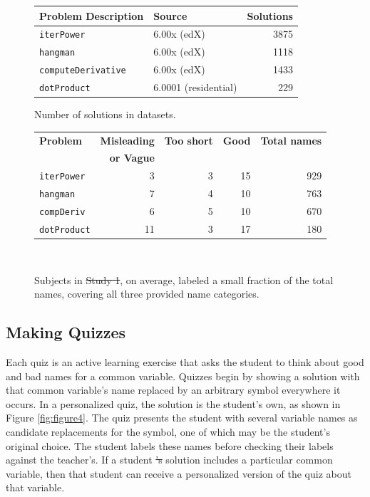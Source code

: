 \documentclass[12pt,twoside]{mitthesis}
\newcommand\tabhead[1]{\small\textbf{#1}}
\newcommand \codevar[1]{\texttt{#1}}
\providecommand{\DIFaddtex}[1]{{\protect\color{blue}\uwave{#1}}} %
\providecommand{\DIFdeltex}[1]{{\protect\color{red}\sout{#1}}}                      %
\providecommand{\DIFaddbegin}{} %
\providecommand{\DIFdelbegin}{} %
\providecommand{\DIFdelend}{} %
\providecommand{\DIFaddFL}[1]{\DIFadd{#1}} %
\providecommand{\DIFdelFL}[1]{\DIFdel{#1}} %
\providecommand{\DIFaddbeginFL}{} %
\providecommand{\DIFaddendFL}{} %
\providecommand{\DIFdelbeginFL}{} %
\providecommand{\DIFdelendFL}{} %
\providecommand{\DIFadd}[1]{\texorpdfstring{\DIFaddtex{#1}}{#1}} %
\providecommand{\DIFdel}[1]{\texorpdfstring{\DIFdeltex{#1}}{}} %
\begin{document}
\DIFdelbegin %
\DIFdelend \DIFaddbegin \begin{figure}
\DIFaddendFL \begin{minipage}{1\columnwidth}
\centering
\begin{tabular} {|l|l|r|}
\hline
\tabhead{Problem Description} & \tabhead{Source} & \tabhead{Solutions} \\ \hline \hline
\codevar{iterPower} & 6.00x (edX) & 3875 \\ \hline
\codevar{hangman} & 6.00x (edX) & 1118 \\ \hline
\codevar{computeDerivative} & 6.00x (edX) & 1433 \\ \hline
\codevar{dotProduct} & 6.0001 (residential) & 229 \\ \hline
\end{tabular}
\caption{Number of solutions in datasets.}
\label{solutioncounttable}
\end{minipage}

\bigskip
\begin{minipage}{1\columnwidth}
\centering
\begin{tabular}{|l|r|r|r|r|}
\hline
\tabhead{Problem} & \tabhead{Misleading} & \tabhead{Too short} & \tabhead{Good} & \tabhead{Total names} \\
& \tabhead{or Vague} & & & \\ \hline \hline
\codevar{iterPower} & 3 & 3 & 15 & 929 \\ \hline
\codevar{hangman} &7 & 4 & 10 & 763 \\ \hline
\codevar{compDeriv} & 6 & 5 & 10 & 670 \\ \hline
\codevar{dotProduct} & 11 & 3 & 17 & 180 \\ \hline
\end{tabular}
\caption{Subjects in \DIFdelbeginFL \DIFdelFL{Study 1}\DIFdelendFL \DIFaddbeginFL \DIFaddFL{the teacher study}\DIFaddendFL , on average, labeled a small fraction of the total names, covering all three provided name categories.}~\label{tab:averageLabeling}
\end{minipage}

\end{figure}

\subsection{Making Quizzes}

Each quiz is an active learning exercise that asks the student to think about good and bad names for a common variable. Quizzes begin by showing a solution with that common variable's name replaced by an arbitrary symbol everywhere it occurs. In a personalized quiz, the solution is the student's own, as shown in Figure \ref{fig:figure4}. The quiz presents the student with several variable names as candidate replacements for the symbol, one of which may be the student's original choice. The student labels these names before checking their labels against the teacher's. If a student \DIFdelbegin \DIFdel{'s }\DIFdelend solution includes a particular common variable, then that student can receive a personalized version of the quiz about that variable.
\end{document}
